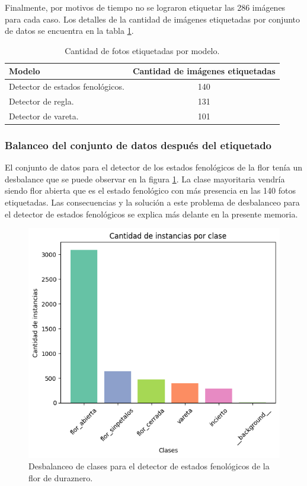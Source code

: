Finalmente, por motivos de tiempo no se lograron etiquetar las 286 imágenes para cada caso. Los detalles de la cantidad de imágenes etiquetadas por conjunto de datos se encuentra en la tabla \ref{tab:etiquetado}. 

\begin{table}[h]
	\centering
	\caption{Cantidad de fotos etiquetadas por modelo.}
	\begin{tabular}{l c }    
		\toprule
		\textbf{Modelo}     & \textbf{Cantidad de imágenes etiquetadas} \\
		\midrule
		Detector de estados fenológicos.                  & 140 \\
		Detector de regla.                  & 131 \\
		Detector de vareta.                  & 101 \\		
		\bottomrule
		\hline
	\end{tabular}
	\label{tab:etiquetado}
\end{table}

\subsubsection{Balanceo del conjunto de datos después del etiquetado}
\label{desbalanceAfterLabeled}

El conjunto de datos para el detector de los estados fenológicos de la flor tenía un desbalance que se puede observar en la figura \ref{fig:desbalanceoDeteccion}. La clase mayoritaria vendría siendo flor abierta que es el estado fenológico con más presencia en las 140 fotos etiquetadas. Las consecuencias y la solución a este problema de desbalanceo para el detector de estados fenológicos se explica más delante en la presente memoria.

\begin{figure}[ht]
	\centering
	\includegraphics[scale=.65]{./Figures/desbalanceo_detector.png}
	\caption{Desbalanceo de clases para el detector de estados fenológicos de la flor de duraznero.}
	\label{fig:desbalanceoDeteccion}
\end{figure}
\newpage

